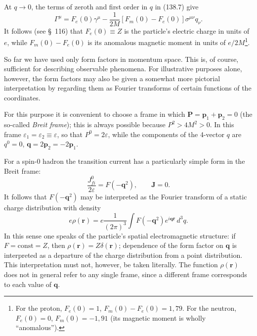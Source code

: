 At $q\to0$, the terms of zeroth and first order in $q$ in (138.7) give
\begin{equation}
\Gamma^\mu=F_e(0)\gamma^\mu-\frac{1}{2M}[F_m(0)-F_e(0)]\sigma^{\mu\nu}q_\nu.
\tag{138.8}
\end{equation}
It follows (see \S~116) that $F_e(0)\equiv Z$ is the particle's electric charge in units of $e$, while $F_m(0)-F_e(0)$ is its anomalous magnetic moment in units of $e/2M$\footnote{For the proton, $F_e(0)=1$, $F_m(0)-F_e(0)=1{,}79$. For the neutron, $F_e(0)=0$, $F_m(0)=-1{,}91$ (its magnetic moment is wholly ``anomalous'').}.

So far we have used only form factors in momentum space. This is, of course, sufficient for describing observable phenomena. For illustrative purposes alone, however, the form factors may also be given a somewhat more pictorial interpretation by regarding them as Fourier transforms of certain functions of the coordinates.

For this purpose it is convenient to choose a frame in which $\mathbf P=\mathbf p_1+\mathbf p_2=0$ (the so-called \emph{Breit frame}); this is always possible because $P^2>4M^2>0$. In this frame $\varepsilon_1=\varepsilon_2\equiv\varepsilon$, so that $P^0=2\varepsilon$, while the components of the 4-vector $q$ are $q^0=0$, $\mathbf q=2\mathbf p_2=-2\mathbf p_1$.

For a spin-0 hadron the transition current has a particularly simple form in the Breit frame:
\[
\frac{J_{fi}^0}{2\varepsilon}=F(-\mathbf q^2),\qquad \mathbf J=0.
\]
It follows that $F(-\mathbf q^2)$ may be interpreted as the Fourier transform of a static charge distribution with density
\begin{equation}
e\rho(\mathbf r)=e\frac{1}{(2\pi)^3}\int F(-\mathbf q^2)e^{i\mathbf q\mathbf r}\,d^3q.
\tag{138.9}
\end{equation}
In this sense one speaks of the particle's spatial electromagnetic structure: if $F=\mathrm{const}=Z$, then $\rho(\mathbf r)=Z\delta(\mathbf r)$; dependence of the form factor on $\mathbf q$ is interpreted as a departure of the charge distribution from a point distribution. This interpretation must not, however, be taken literally. The function $\rho(\mathbf r)$ does not in general refer to any single frame, since a different frame corresponds to each value of $\mathbf q$.

